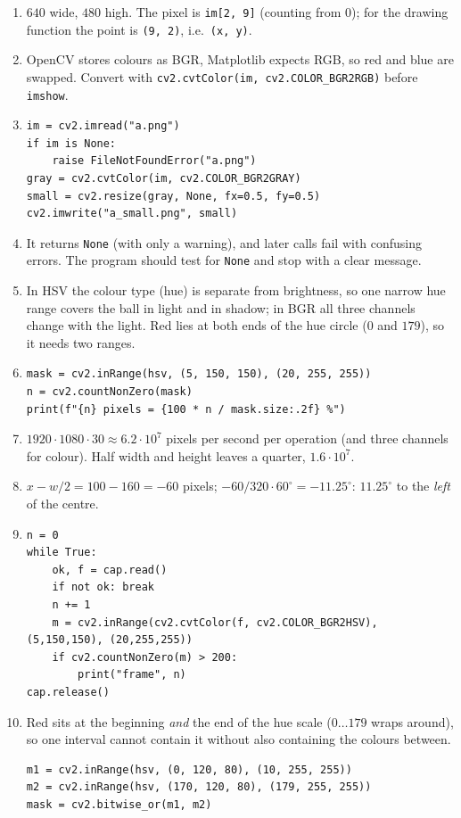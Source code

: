 \begin{enumerate}[label=\textbf{\ansnum.\arabic*}]
  \item $640$ wide, $480$ high. The pixel is \texttt{im[2, 9]} (counting from $0$); for the drawing function the point is \texttt{(9, 2)}, i.e.\ \texttt{(x, y)}.
  \item OpenCV stores colours as BGR, Matplotlib expects RGB, so red and blue are swapped. Convert with \verb!cv2.cvtColor(im, cv2.COLOR_BGR2RGB)! before \texttt{imshow}.
  \item
\begin{verbatim}
im = cv2.imread("a.png")
if im is None:
    raise FileNotFoundError("a.png")
gray = cv2.cvtColor(im, cv2.COLOR_BGR2GRAY)
small = cv2.resize(gray, None, fx=0.5, fy=0.5)
cv2.imwrite("a_small.png", small)
\end{verbatim}
  \item It returns \texttt{None} (with only a warning), and later calls fail with confusing errors. The program should test for \texttt{None} and stop with a clear message.
  \item In HSV the colour type (hue) is separate from brightness, so one narrow hue range covers the ball in light and in shadow; in BGR all three channels change with the light. Red lies at both ends of the hue circle ($0$ and $179$), so it needs two ranges.
  \item
\begin{verbatim}
mask = cv2.inRange(hsv, (5, 150, 150), (20, 255, 255))
n = cv2.countNonZero(mask)
print(f"{n} pixels = {100 * n / mask.size:.2f} %")
\end{verbatim}
  \item $1920\cdot1080\cdot30\approx6.2\cdot10^7$ pixels per second per operation (and three channels for colour). Half width and height leaves a quarter, $1.6\cdot10^7$.
  \item $x-w/2=100-160=-60$ pixels; $-60/320\cdot60^\circ=-11.25^\circ$: $11.25^\circ$ to the \emph{left} of the centre.
  \item
\begin{verbatim}
n = 0
while True:
    ok, f = cap.read()
    if not ok: break
    n += 1
    m = cv2.inRange(cv2.cvtColor(f, cv2.COLOR_BGR2HSV), (5,150,150), (20,255,255))
    if cv2.countNonZero(m) > 200:
        print("frame", n)
cap.release()
\end{verbatim}
  \item[\textbf{\ansnum.10}] Red sits at the beginning \emph{and} the end of the hue scale ($0\dots179$ wraps around), so one interval cannot contain it without also containing the colours between.
\begin{verbatim}
m1 = cv2.inRange(hsv, (0, 120, 80), (10, 255, 255))
m2 = cv2.inRange(hsv, (170, 120, 80), (179, 255, 255))
mask = cv2.bitwise_or(m1, m2)
\end{verbatim}
\end{enumerate}
